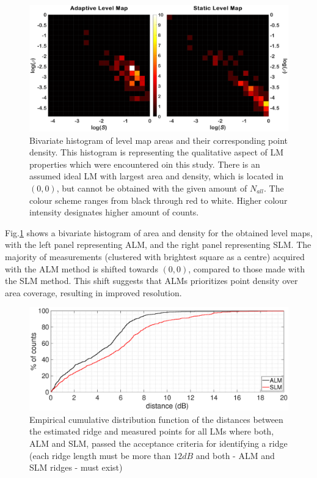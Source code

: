\documentclass[journal,twoside,web]{ieeecolor2}
\begin{document}
\begin{figure}
\centering
\includegraphics[width=.8\textwidth]{Fig_8_Coverage_sameClim.eps} %
\caption{Bivariate histogram of level map areas and their corresponding point density.
This histogram is representing the qualitative aspect of LM properties which were encountered oin this study.
There is an assumed ideal LM with largest area and density, which is located in $(0, 0)$, but cannot be obtained with the given amount of $N_{all}$.
The colour scheme ranges from black through red to white.
Higher colour intensity designates higher amount of counts.}
\label{fig_TGT}
\end{figure}

Fig.\ref{fig_TGT} shows a bivariate histogram of area and density for the obtained level maps, with the left panel representing ALM, and the right panel representing SLM.
The majority of measurements (clustered with brightest square as a centre) acquired with the ALM method is shifted towards $(0, 0)$, compared to those made with the SLM method.
This shift suggests that ALMs prioritizes point density over area coverage, resulting in improved resolution.


\begin{figure}[ht]
\centerline{\includegraphics[width=\columnwidth]{Fig_9_Cumula.eps}}
\caption{Empirical cumulative distribution function of the distances between the estimated ridge and measured points for all LMs where both, ALM and SLM, passed the acceptance criteria for identifying a ridge (each ridge length must be more than $12dB$ and both - ALM and SLM ridges - must exist)}
\label{fig_CDF}
\end{figure}
\end{document}
